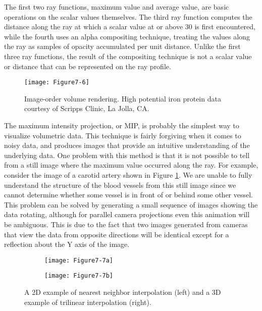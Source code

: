 The first two ray functions, maximum value and average value, are basic operations on the scalar values themselves. The third ray function computes the distance along the ray at which a scalar value at or above 30 is first encountered, while the fourth uses an alpha compositing technique, treating the values along the ray as samples of opacity accumulated per unit distance. Unlike the first three ray functions, the result of the compositing technique is not a scalar value or distance that can be represented on the ray profile.

\begin{figure}[!htb]
	\centering
	\texttt{[image: Figure7-6]}\\
	\caption{Image-order volume rendering. High potential iron protein data courtesy of Scripps Clinic, La Jolla, CA.}\label{fig:Figure7-6}
\end{figure}

The maximum intensity projection, or MIP, is probably the simplest way to visualize volumetric data. This technique is fairly forgiving when it comes to noisy data, and produces images that provide an intuitive understanding of the underlying data. One problem with this method is that it is not possible to tell from a still image where the maximum value occurred along the ray. For example, consider the image of a carotid artery shown in Figure \ref{fig:Figure7-6}. We are unable to fully understand the structure of the blood vessels from this still image since we cannot determine whether some vessel is in front of or behind some other vessel. This problem can be solved by generating a small sequence of images showing the data rotating, although for parallel camera projections even this animation will be ambiguous. This is due to the fact that two images generated from cameras that view the data from opposite directions will be identical except for a reflection about the Y axis of the image.

\begin{figure}[!htb]
	\begin{subfigure}[h]{0.48\linewidth}
		\texttt{[image: Figure7-7a]}
		\caption*{}\label{fig:Figure7-7a}
	\end{subfigure}
	\hfill
	\begin{subfigure}[h]{0.48\linewidth}
		\texttt{[image: Figure7-7b]}
		\caption*{}\label{fig:Figure7-7b}
	\end{subfigure}%
	\caption{A 2D example of nearest neighbor interpolation (left) and a 3D example of trilinear interpolation (right).}\label{fig:Figure7-7}
\end{figure}


